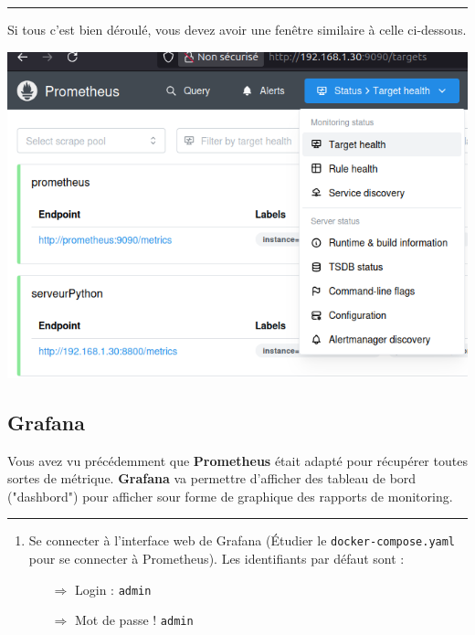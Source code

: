 \documentclass[french, 12pt]{article}%
\newif\ifPROF
\begin{document}
\begin{center}
 \rule{0.75\linewidth}{1pt}
 \end{center}

Si tous c'est bien déroulé, vous devez avoir une fenêtre similaire à celle ci-dessous.

\begin{center}
\includegraphics[scale=0.7]{./ressource/prometheus}
\end{center}


\ifPROF
\color{red}
\begin{lstlisting}[style=commande]  
Pour ce connecter : http://192.168.1.111:9090/

Il faut juste faire attention au port
\end{lstlisting}

\normalcolor
\fi


\subsection{Grafana}
Vous avez vu précédemment que \textbf{Prometheus} était adapté pour récupérer toutes sortes de métrique. \textbf{Grafana} va permettre d'afficher des  tableau de bord ("dashbord") pour afficher sour forme de graphique des rapports de monitoring. 



\begin{center}
 \rule{0.75\linewidth}{1pt}
 \end{center}

\begin{enumerate}[resume]
\item Se connecter à l'interface web de Grafana  (Étudier le \verb?docker-compose.yaml? pour se connecter à Prometheus). Les identifiants par défaut sont : 
	\begin{itemize}
	\item[$\Rightarrow$] Login : \verb?admin?
	\item[$\Rightarrow$] Mot de passe ! \verb?admin?
	\end{itemize}
\end{enumerate}
\end{document}
